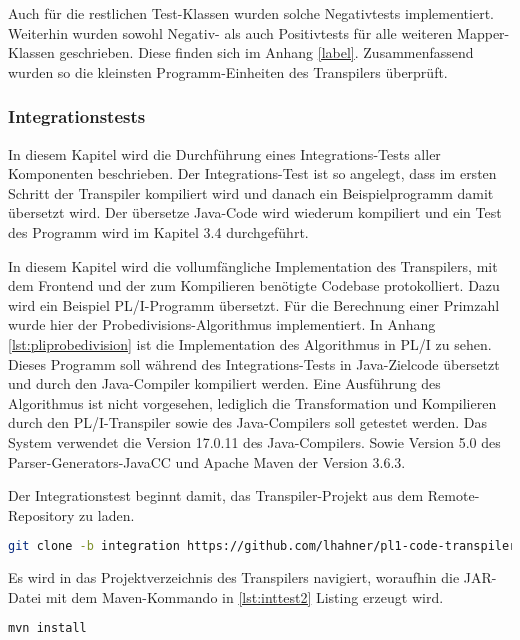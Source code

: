 Auch für die restlichen Test-Klassen wurden solche Negativtests implementiert. 
Weiterhin wurden sowohl Negativ- als auch Positivtests für alle weiteren Mapper-Klassen geschrieben. Diese finden sich im Anhang \ref{label}.
Zusammenfassend wurden so die kleinsten Programm-Einheiten des Transpilers überprüft. 
\pagebreak

\subsubsection{Integrationstests}
In diesem Kapitel wird die Durchführung eines Integrations-Tests aller Komponenten beschrieben. Der Integrations-Test ist so angelegt, dass im ersten Schritt der Transpiler kompiliert wird und danach ein Beispielprogramm damit übersetzt wird. Der übersetze Java-Code wird wiederum kompiliert und ein Test des Programm wird im Kapitel 3.4 durchgeführt.

In diesem Kapitel wird die vollumfängliche Implementation des Transpilers, mit dem Frontend und der zum Kompilieren benötigte Codebase protokolliert. Dazu wird ein Beispiel PL/I-Programm übersetzt. Für die Berechnung einer Primzahl wurde hier der Probedivisions-Algorithmus implementiert. In Anhang \ref{lst:pliprobedivision} ist die Implementation des Algorithmus in PL/I zu sehen. Dieses Programm soll während des Integrations-Tests in Java-Zielcode übersetzt und durch den Java-Compiler kompiliert werden.
Eine Ausführung des Algorithmus ist nicht vorgesehen, lediglich die Transformation und Kompilieren durch den PL/I-Transpiler sowie des Java-Compilers
soll getestet werden. Das System verwendet die Version 17.0.11 des Java-Compilers. Sowie Version 5.0 des Parser-Generators-JavaCC und Apache Maven der Version 3.6.3.

Der Integrationstest beginnt damit, das Transpiler-Projekt aus dem Remote-Repository zu laden.

\begin{lstlisting}[language=Bash, caption=Laden des Transpilers, label={lst:inttest1}]
git clone -b integration https://github.com/lhahner/pl1-code-transpiler.git
\end{lstlisting} 

Es wird in das Projektverzeichnis des Transpilers navigiert, woraufhin die JAR-Datei mit dem Maven-Kommando in \ref{lst:inttest2} Listing erzeugt wird.

\begin{lstlisting}[language=Bash, caption=Erzeugen der JAR, label={lst:inttest2}]
mvn install
\end{lstlisting}

